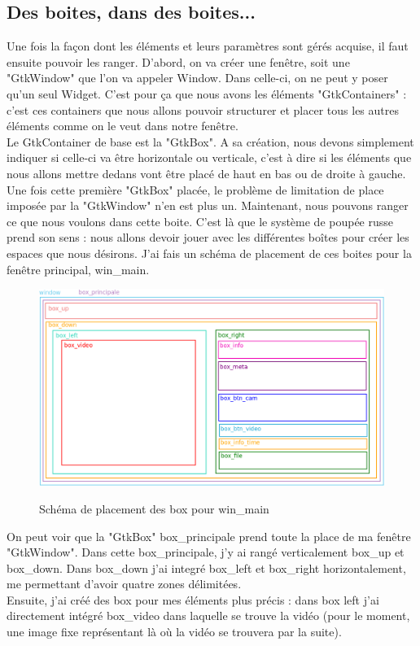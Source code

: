\documentclass[11pt,french,a4paper]{report}
\begin{document}
        \subsection{Des boites, dans des boites...}
Une fois la façon dont les éléments et leurs paramètres sont gérés acquise, il faut ensuite pouvoir les ranger. 
D'abord, on va créer une fenêtre, soit une "GtkWindow" que l'on va appeler Window. Dans celle-ci, on ne peut y poser qu'un seul Widget. 
C'est pour ça que nous avons les éléments "GtkContainers" : c'est ces containers que nous allons pouvoir structurer et placer tous 
les autres éléments comme on le veut dans notre fenêtre. \\

Le GtkContainer de base est la "GtkBox". A sa création, nous devons simplement indiquer si celle-ci va être horizontale ou verticale, 
c'est à dire si les éléments que nous allons mettre dedans vont être placé de haut en bas ou de droite à gauche. 
Une fois cette première "GtkBox" placée, le problème de limitation de place imposée par la "GtkWindow" n'en est plus un. 
Maintenant, nous pouvons ranger ce que nous voulons dans cette boite. C'est là que le système de poupée russe prend son sens : 
nous allons devoir jouer avec les différentes boîtes pour créer les espaces que nous désirons. 
J'ai fais un schéma de placement de ces boites pour la fenêtre principal, win\_main. 
\begin{figure}[!h]
    \centering
        \includegraphics[scale=0.5]{../images/dia/schema_bloc_mainwin.png} \\
        \caption{Schéma de placement des box pour win\_main}
        \label{sch_box_win_main}
\end{figure}

On peut voir que la "GtkBox" box\_principale prend toute la place de ma fenêtre "GtkWindow". Dans cette box\_principale, j'y ai rangé 
verticalement box\_up et box\_down. Dans box\_down j'ai integré box\_left et box\_right horizontalement, me permettant d'avoir 
quatre zones délimitées. \\
Ensuite, j'ai créé des box pour mes éléments plus précis : dans box left j'ai directement intégré box\_video dans laquelle 
se trouve la vidéo (pour le moment, une image fixe représentant là où la vidéo se trouvera par la suite). 
\end{document}
